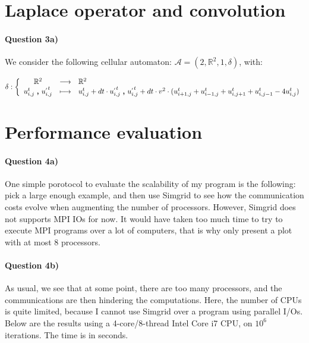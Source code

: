 \documentclass[a4paper,12pt]{article}
\begin{document}
\section{Laplace operator and convolution}

\paragraph{Question 3a)} We consider the following cellular automaton: $\mathcal{A} = (2, \mathbb{R}^2, 1, \delta)$, with:

\begin{eqnarray*}
\delta : \left \{ \begin{array}{c c l }
  \mathbb{R}^2 & \longrightarrow & \mathbb{R}^2 \\
  u^{t}_{i,j}\ \pmb{,} \ u^{_{'} t}_{i,j} & \longmapsto & u^{t}_{i,j} + dt \cdot u^{_{'} t}_{i,j}\ \pmb{,} \ u^{_{'} t}_{i,j} + dt \cdot v^2 \cdot (u^t_{i+1,j} + u^t_{i-1, j} + u^t_{i, j+1} + u^t_{i, j-1} - 4 u^t_{i, j})\\
  \end{array} \right .
\end{eqnarray*}


\section{Performance evaluation}

\paragraph{Question 4a)} One simple porotocol to evaluate the scalability of my program is the following: pick a large enough example, and then use Simgrid to see how the communication costs evolve when augmenting the number of processors. However, Simgrid does not supports MPI IOs for now. It would have taken too much time to try to execute MPI programs over a lot of computers, that is why only present a plot with at most 8 processors.

\paragraph{Question 4b)} As usual, we see that at some point, there are too many processors, and the communications are then hindering the computations. Here, the number of CPUs is quite limited, because I cannot use Simgrid over a program using parallel I/Os. Below are the results using a 4-core/8-thread Intel Core i7 CPU, on $10^6$ iterations. The time is in seconds.
\end{document}
